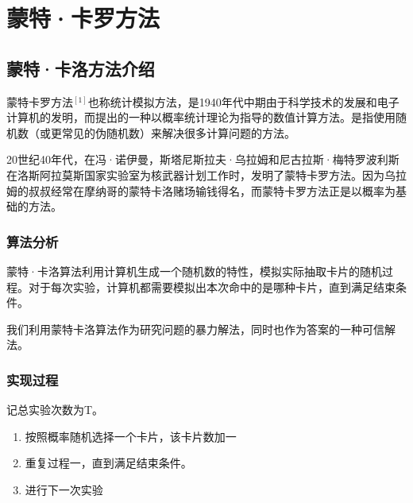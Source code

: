 \documentclass[master]{thesis-uestc}
\begin{document}
\chapter{蒙特·卡罗方法}
\section{蒙特·卡洛方法介绍}
蒙特卡罗方法$^{[1]}$也称统计模拟方法，是1940年代中期由于科学技术的发展和电子计算机的发明，而提出的一种以概率统计理论为指导的数值计算方法。是指使用随机数（或更常见的伪随机数）来解决很多计算问题的方法。 

20世纪40年代，在冯·诺伊曼，斯塔尼斯拉夫·乌拉姆和尼古拉斯·梅特罗波利斯在洛斯阿拉莫斯国家实验室为核武器计划工作时，发明了蒙特卡罗方法。因为乌拉姆的叔叔经常在摩纳哥的蒙特卡洛赌场输钱得名，而蒙特卡罗方法正是以概率为基础的方法。 


\subsection{算法分析}

蒙特·卡洛算法利用计算机生成一个随机数的特性，模拟实际抽取卡片的随机过程。对于每次实验，计算机都需要模拟出本次命中的是哪种卡片，直到满足结束条件。

我们利用蒙特卡洛算法作为研究问题的暴力解法，同时也作为答案的一种可信解法。

\subsection{实现过程}

记总实验次数为T。

\begin{enumerate}
    \item 按照概率随机选择一个卡片，该卡片数加一
    \item 重复过程一，直到满足结束条件。
    \item 进行下一次实验
\end{enumerate}
\end{document}
